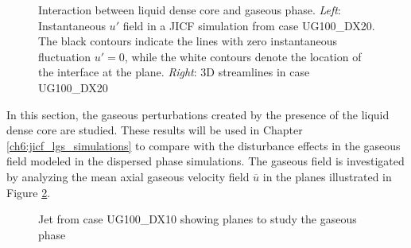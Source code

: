 \begin{figure}[ht]
\flushleft
{}
\caption[Interaction between liquid dense core and gaseous phase.]{Interaction between liquid dense core and gaseous phase. \textsl{Left}: Instantaneous $u'$ field in a JICF simulation from case UG100\_DX20. The black contours indicate the lines with zero instantaneous fluctuation $u' = 0$, while the white contours denote the location of the interface at the plane. \textsl{Right}: 3D streamlines in case UG100\_DX20}
\label{fig:jet_air_interaction_up_and_skeleton}
\end{figure}


In this section, the gaseous perturbations created by the presence of the liquid dense core are studied. These results will be used in Chapter \ref{ch6:jicf_lgs_simulations} to compare with the disturbance effects in the gaseous field modeled in the dispersed phase simulations. The gaseous field is investigated by analyzing the mean axial gaseous velocity field $\overline{u}$ in the planes illustrated in Figure \ref{fig:jicf_sps_with_gaseous_planes}. %


\begin{figure}[h!]
	\centering
	\caption{Jet from case UG100\_DX10 showing planes to study the gaseous phase}
	\label{fig:jicf_sps_with_gaseous_planes}
\end{figure}


